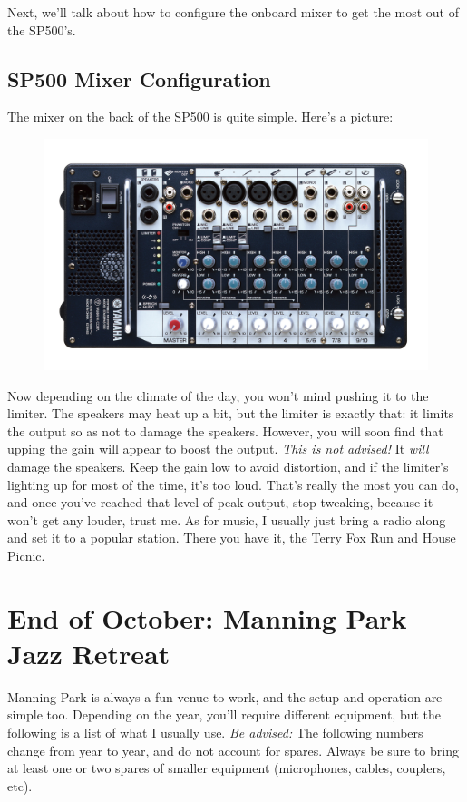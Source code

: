 \documentclass[letterpaper,10pt,oneside,headsepline]{scrreprt}
\begin{document}
Next, we'll talk about how to configure the onboard mixer to get the most out of the SP500's.
\subsection{SP500 Mixer Configuration}
The mixer on the back of the SP500 is quite simple. Here's a picture: 
\begin{figure}[ht]
\centering
\includegraphics[scale=1]{STAGEPAS500_07} 
\end{figure}

Now depending on the climate of the day, you won't mind pushing it to the limiter. The speakers may heat up a bit, but the limiter is exactly that: it limits the output so as not to damage the speakers. However, you will soon find that upping the gain will appear to boost the output. \textit{This is not advised!} It \textit{will} damage the speakers. Keep the gain low to avoid distortion, and if the limiter's lighting up for most of the time, it's too loud. That's really the most you can do, and once you've reached that level of peak output, stop tweaking, because it won't get any louder, trust me. As for music, I usually just bring a radio along and set it to a popular station. There you have it, the Terry Fox Run and House Picnic.

\section{End of October: Manning Park Jazz Retreat}
Manning Park is always a fun venue to work, and the setup and operation are simple too. Depending on the year, you'll require different equipment, but the following is a list of what I usually use. \textit{Be advised:} The following numbers change from year to year, and do not account for spares. Always be sure to bring at least one or two spares of smaller equipment (microphones, cables, couplers, etc).
\end{document}
